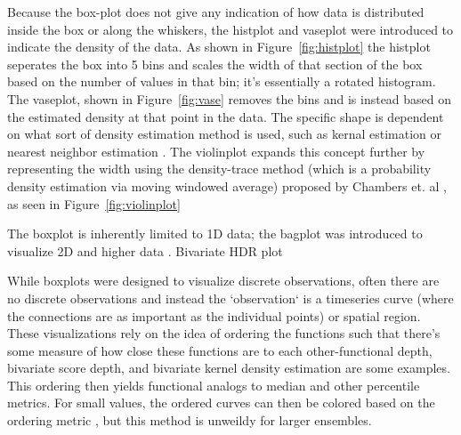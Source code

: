 \begin{figure}
\label{fig:histplot}
\label{fig:vase}
\label{fig:violin}
\end{figure}

Because the box-plot does not give any indication of how data is distributed
inside the box or along the whiskers, the histplot and vaseplot were introduced to indicate
the density of the data\cite{benjamini1988}. As shown in
Figure~\ref{fig:histplot} the histplot seperates the box
into  5 bins and scales the width of that section of the box based on the
number of values in that bin; it's essentially a rotated histogram. The
vaseplot, shown in Figure~\ref{fig:vase} removes the bins and is instead based
on the estimated density at that point in the data. The specific shape is
dependent on what sort of density estimation method is used, such as kernal
estimation or nearest neighbor estimation \cite{chambers1983}. The
violinplot \cite{hintz1998} expands this concept further by representing the
width using the density-trace method (which is a probability density estimation
via moving windowed average) proposed by Chambers et. al \cite{chambers1983}, as seen in Figure~\ref{fig:violinplot}%



\begin{figure}
\end{figure}
The boxplot is inherently limited to 1D data; the bagplot was introduced to
visualize 2D and higher data \cite{roussow1999}.
Bivariate HDR plot \cite{Hyndman1996}

While boxplots were designed to visualize discrete observations, often there
are no discrete observations and instead the `observation` is a timeseries
curve (where the connections are as important as the individual points) or
spatial region. These visualizations rely on the idea of ordering the
functions such that there's some measure of how close these functions are to
each other-functional depth\cite{fabrero2007}, bivariate score depth\cite{hyndman2009}, and
bivariate kernel density estimation\cite{scott92} are some examples. This
ordering then yields functional analogs to median and other percentile
metrics. For small values, the ordered curves can then be colored based on the
ordering metric \cite{hyndman2009}, but this method is unweildy for larger
ensembles.

